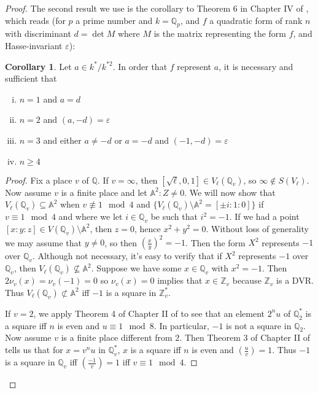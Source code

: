 \documentclass{article}
\theoremstyle{customplain}
\theoremstyle{customdef}
\newcommand{\leg}[2]{\genfrac{(}{)}{}{}{#1}{#2}} %
\newcommand{\A}{\mathbb{A}}
\newcommand{\Z}{\mathbb{Z}}
\newcommand{\Q}{\mathbb{Q}}
\newcommand{\eps}{\varepsilon}
\theoremstyle{definition} %
\newtheorem*{corollary*}{Corollary}
\renewcommand{\ge}{\geqslant}
\begin{document}
\begin{proof}
    The second result we use is the corollary to Theorem 6 in Chapter IV of \cite{CourseArithmetic}, which reads (for $p$ a prime number and $k=\Q_p$, and $f$ a quadratic form of rank $n$ with discriminant $d=\det M$ where $M$ is the matrix representing the form $f$, and Hasse-invariant $\eps$):
    \begin{corollary*}
        Let $a\in k^*/k^{*2}.$ In order that $f$ represent $a$, it is necessary and sufficient that
        \begin{enumerate}[(i)]
            \item $n=1$ and $a=d$
            \item $n=2$ and $(a,-d)=\eps$
            \item $n=3$ and either $a\ne -d$ or $a=-d$ and $(-1, -d)=\eps$
            \item $n\ge 4$
        \end{enumerate}
        
    \end{corollary*}
\begin{proof}
    Fix a place $v$ of $\Q$. If $v=\infty$, then $[\sqrt{\ell}, 0,1]\in V_\ell(\Q_v)$, so $\infty \notin S(V_\ell).$ Now assume $v$ is a finite place and let $\A^2:Z\ne 0$. We will now show that $V_\ell(\Q_v)\subseteq \A^2$ when $v\not \equiv 1 \mod 4$ and $\{V_\ell(\Q_v)\setminus \A^2 = [\pm i:1:0]\}$ if $v\equiv 1 \mod 4$ and where we let $i\in \Q_v$ be such that $i^2=-1.$ If we had a point $[x:y:z]\in V(\Q_v)\setminus \A^2$, then $z=0$, hence $x^2+y^2 = 0.$ Without loss of generality we may assume that $y\ne 0$, so then $(\frac{x}{y})^2=-1$. Then the form $X^2$ represents $-1$ over $\Q_v.$ Although not necessary, it's easy to verify that if $X^2$ represents $-1$ over $\Q_v$, then $V_\ell(\Q_v)\not \subseteq \A^2.$ 
    Suppose we have some $x\in \Q_v$ with $x^2=-1.$ Then $2\nu_v(x)=\nu_v(-1)=0$ so $\nu_v(x)=0$ implies that $x\in \Z_v$ because $\Z_v$ is a DVR. Thus $V_\ell(\Q_v)\not \subset \A^2$ iff $-1$ is a square in $\Z_v^*.$
    
    If $v=2$, we apply Theorem 4 of Chapter II of \cite{CourseArithmetic} to see that an element $2^n u$ of $\Q_2^*$ is a square iff $n$ is even and $u\equiv 1 \mod 8.$ In particular, $-1$ is not a square in $\Q_2$. Now assume $v$ is a finite place different from $2.$ Then Theorem 3 of Chapter II of \cite{CourseArithmetic} tells us that for $x=v^n u$ in $\Q_v^*$, $x$ is a square iff $n$ is even and $\leg{u}{v}=1.$ Thus $-1$ is a square in $\Q_v$ iff $\leg{-1}{v}=1$ iff $v\equiv 1 \mod 4.$
    

\end{proof}
\end{proof}
\end{document}
